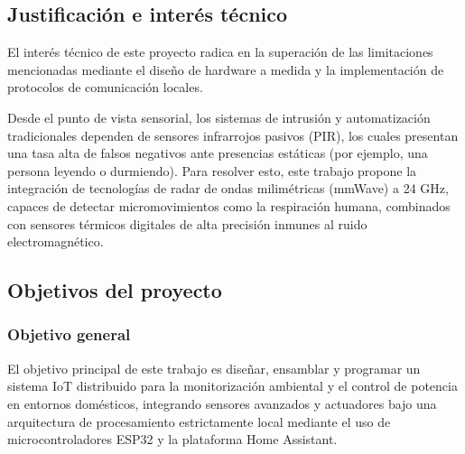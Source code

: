 \subsection{Justificación e interés técnico}
El interés técnico de este proyecto radica en la superación de las limitaciones mencionadas mediante el diseño de hardware a medida y la implementación de protocolos de comunicación locales. 

Desde el punto de vista sensorial, los sistemas de intrusión y automatización tradicionales dependen de sensores infrarrojos pasivos (PIR), los cuales presentan una tasa alta de falsos negativos ante presencias estáticas (por ejemplo, una persona leyendo o durmiendo). Para resolver esto, este trabajo propone la integración de tecnologías de radar de ondas milimétricas (mmWave) a 24 GHz, capaces de detectar micromovimientos como la respiración humana, combinados con sensores térmicos digitales de alta precisión inmunes al ruido electromagnético.

\subsection{Objetivos del proyecto}

\subsubsection{Objetivo general}
El objetivo principal de este trabajo es diseñar, ensamblar y programar un sistema IoT distribuido para la monitorización ambiental y el control de potencia en entornos domésticos, integrando sensores avanzados y actuadores bajo una arquitectura de procesamiento estrictamente local mediante el uso de microcontroladores ESP32 y la plataforma Home Assistant.

